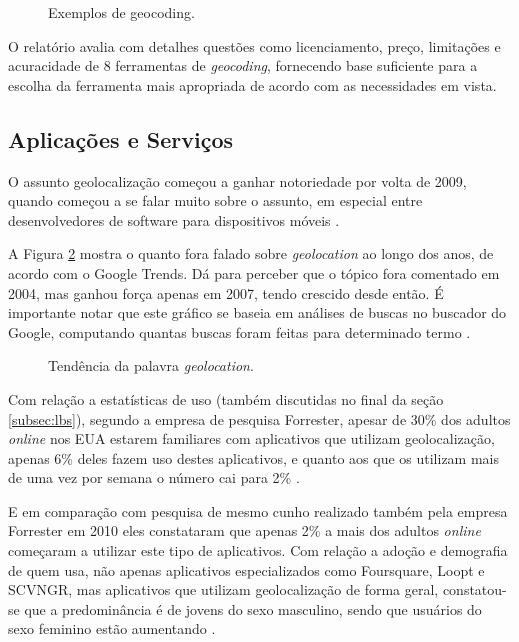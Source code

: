 \documentclass[diss]{template/setrem}
\begin{document}
\begin{figure}[!h]
    \caption{Exemplos de geocoding.}
    \label{fig:geocoding}
\end{figure}

O relatório \citet{Swift2008} avalia com detalhes questões como licenciamento, preço, limitações e acuracidade de 8 ferramentas de \emph{geocoding}, fornecendo base suficiente para a escolha da ferramenta mais apropriada de acordo com as necessidades em vista.

\subsection{Aplicações e Serviços}
O assunto geolocalização começou a ganhar notoriedade por volta de 2009, quando começou a se falar muito sobre o assunto, em especial entre desenvolvedores de software para dispositivos móveis \citep{Holdener2011}.

A Figura \ref{fig:geolocation-trends} mostra o quanto fora falado sobre \emph{geolocation} ao longo dos anos, de acordo com o Google Trends. Dá para perceber que o tópico fora comentado em 2004, mas ganhou força apenas em 2007, tendo crescido desde então. É importante notar que este gráfico se baseia em análises de buscas no buscador do Google, computando quantas buscas foram feitas para determinado termo \citep{GoogleTrends2012a}.

\begin{figure}[!h]
    \caption{Tendência da palavra \emph{geolocation}.}
    \label{fig:geolocation-trends}
\end{figure}

Com relação a estatísticas de uso (também discutidas no final da seção \ref{subsec:lbs}), segundo a empresa de pesquisa Forrester, apesar de 30\% dos adultos \emph{online} nos EUA estarem familiares com aplicativos que utilizam geolocalização, apenas 6\% deles fazem uso destes aplicativos, e quanto aos que os utilizam mais de uma vez por semana o número cai para 2\% \citep{Grove2011}.

E em comparação com pesquisa de mesmo cunho realizado também pela empresa Forrester em 2010 eles constataram que apenas 2\% a mais dos adultos \emph{online} começaram a utilizar este tipo de aplicativos. Com relação a adoção e demografia de quem usa, não apenas aplicativos especializados como Foursquare, Loopt e SCVNGR, mas aplicativos que utilizam geolocalização de forma geral, constatou-se que a predominância é de jovens do sexo masculino, sendo que usuários do sexo feminino estão aumentando \citep{Grove2011}.
\end{document}
